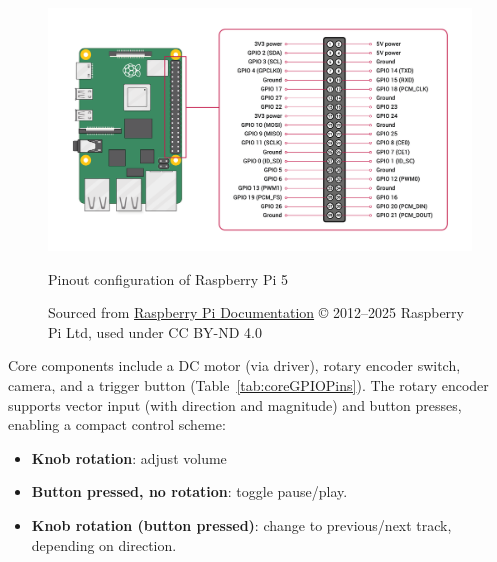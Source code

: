                 \begin{figure}[htbp]
                    \centering
                    \includegraphics[width=\linewidth]{images/raspberry-pi-5-pinout.png}
                    \caption{Pinout configuration of Raspberry Pi 5}
                    \label{fig:RPi5Pinout}
                    \caption*{Sourced from \href{https://www.raspberrypi.com/documentation/computers/raspberry-pi.html#gpio}{Raspberry Pi Documentation} © 2012–2025 Raspberry Pi Ltd, used under CC BY-ND 4.0}
                \end{figure}
    
                Core components include a DC motor (via driver), rotary encoder switch, camera, and a trigger button (Table~\ref{tab:coreGPIOPins}). The rotary encoder supports vector input (with direction and magnitude) and button presses, enabling a compact control scheme:
    
                \begin{itemize}
                    \item \textbf{Knob rotation}: adjust volume
                    \item \textbf{Button pressed, no rotation}: toggle pause/play.
                    \item \textbf{Knob rotation (button pressed)}: change to previous/next track, depending on direction.
                \end{itemize}
    
